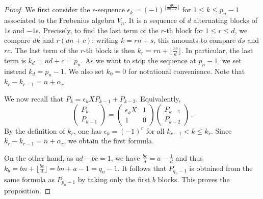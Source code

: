 \documentclass{amsart}
\theoremstyle{definition}
\begin{document}
\begin{proof}
We first consider the $\epsilon$-sequence $\epsilon_k=(-1)^{\lfloor \frac{dk}{dn+c}\rfloor}$  for $1 \leq k \leq p_n -1$ associated to the Frobenius algebra $V_n$. It is a sequence of $d$ alternating blocks of $1$s and $-1$s. Precisely, to find the last term of the $r$-th block for $1 \leq r \leq d$, we compare $dk$ and $r(dn+c)$: 
writing $k=rn+s$, this amounts to compare $ds$ and $rc$. The last term of the $r$-th block is then $k_r=rn+\lfloor\frac{rc}{d}\rfloor$. In particular, the last term is $k_d=nd+c=p_n$. As we want to stop the sequence at $p_n-1$, we set instead $k_d=p_n-1$. We also set $k_0=0$ for notational convenience. Note that $k_r - k_{r-1} = n +\alpha_r$.

We now recall that $P_k=\epsilon_kXP_{k-1}+P_{k-2}$. Equivalently,
$$\begin{pmatrix}P_{k}\\P_{k-1}\end{pmatrix}=\begin{pmatrix}\epsilon_k X& 1 \\ 1 & 0\end{pmatrix}\begin{pmatrix} P_{k-1} \\ P_{k-2}\end{pmatrix}\,.$$
By the definition of $k_r$, one has $\epsilon_k=(-1)^r$ for all $k_{r-1} < k \leq k_{r}$. Since $k_r -k_{r-1} = n+\alpha_r$, we obtain the first formula.

On the other hand, as $ad-bc=1$, we have $\frac{bc}{d}=a-\frac{1}{d}$ and thus
$k_b=bn+\lfloor \frac{bc}{d}\rfloor = bn+a-1 =q_n -1$. It follows that $P_{q_n-1}$ is obtained from the same formula as $P_{p_n-1}$ by taking only the first $b$ blocks. This proves the proposition.
\end{proof}
\end{document}

